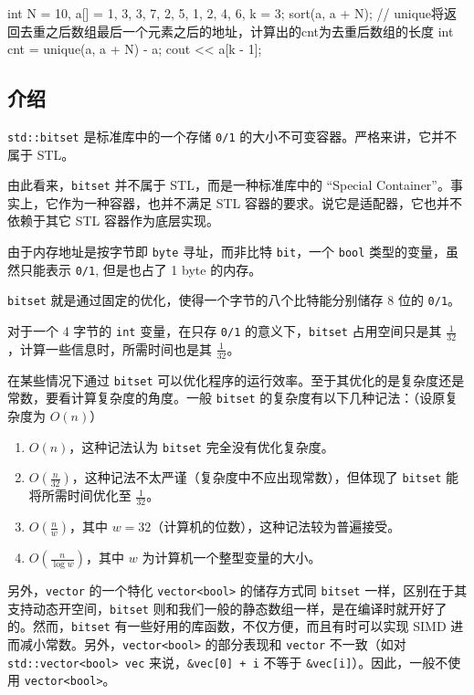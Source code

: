 \begin{codeline}
int N = 10, a[] = {1, 3, 3, 7, 2, 5, 1, 2, 4, 6}, k = 3;
sort(a, a + N);
// unique将返回去重之后数组最后一个元素之后的地址，计算出的cnt为去重后数组的长度
int cnt = unique(a, a + N) - a;
cout << a[k - 1];
\end{codeline}


\subsection{介绍}\label{ux4ecbux7ecd}

\texttt{std::bitset} 是标准库中的一个存储 \texttt{0/1} 的大小不可变容器。严格来讲，它并不属于 STL。

由此看来，\texttt{bitset} 并不属于 STL，而是一种标准库中的 ``Special Container''。事实上，它作为一种容器，也并不满足 STL 容器的要求。说它是适配器，它也并不依赖于其它 STL 容器作为底层实现。

由于内存地址是按字节即 \texttt{byte} 寻址，而非比特 \texttt{bit}，一个 \texttt{bool} 类型的变量，虽然只能表示 \texttt{0/1}, 但是也占了 1 byte 的内存。

\texttt{bitset} 就是通过固定的优化，使得一个字节的八个比特能分别储存 8 位的 \texttt{0/1}。

对于一个 4 字节的 \texttt{int} 变量，在只存 \texttt{0/1} 的意义下，\texttt{bitset} 占用空间只是其 \(\frac{1}{32}\)，计算一些信息时，所需时间也是其 \(\frac 1{32}\)。

在某些情况下通过 \texttt{bitset} 可以优化程序的运行效率。至于其优化的是复杂度还是常数，要看计算复杂度的角度。一般 \texttt{bitset} 的复杂度有以下几种记法：（设原复杂度为 \(O(n)\)）

\begin{enumerate}
\def\labelenumi{\arabic{enumi}.}
\tightlist
\item
  \(O(n)\)，这种记法认为 \texttt{bitset} 完全没有优化复杂度。
\item
  \(O(\frac n{32})\)，这种记法不太严谨（复杂度中不应出现常数），但体现了 \texttt{bitset} 能将所需时间优化至 \(\frac 1{32}\)。
\item
  \(O(\frac n w)\)，其中 \(w=32\)（计算机的位数），这种记法较为普遍接受。
\item
  \(O(\frac n {\log w})\)，其中 \(w\) 为计算机一个整型变量的大小。
\end{enumerate}

另外，\texttt{vector} 的一个特化 \texttt{vector\textless{}bool\textgreater{}} 的储存方式同 \texttt{bitset} 一样，区别在于其支持动态开空间，\texttt{bitset} 则和我们一般的静态数组一样，是在编译时就开好了的。然而，\texttt{bitset} 有一些好用的库函数，不仅方便，而且有时可以实现 SIMD 进而减小常数。另外，\texttt{vector\textless{}bool\textgreater{}} 的部分表现和 \texttt{vector} 不一致（如对 \texttt{std::vector\textless{}bool\textgreater{}\ vec} 来说，\texttt{\&vec{[}0{]}\ +\ i} 不等于 \texttt{\&vec{[}i{]}}）。因此，一般不使用 \texttt{vector\textless{}bool\textgreater{}}。

